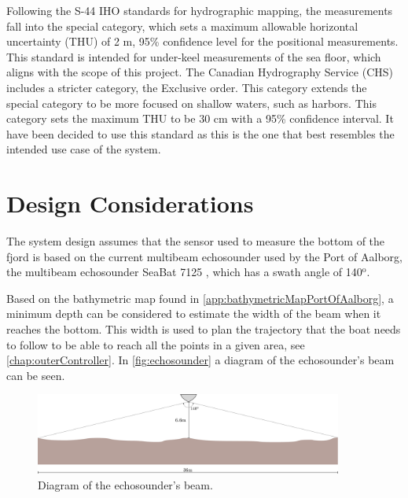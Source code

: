 Following the S-44 IHO standards for hydrographic mapping, the measurements fall into the special category, which sets a maximum allowable horizontal uncertainty (THU) of 2 m, 95\% confidence level for the positional measurements. 
This standard is intended for under-keel measurements of the sea floor, which aligns with the scope of this project.\cite{IHO-S-44} 
The Canadian Hydrography Service (CHS) includes a stricter category, the Exclusive order. 
This category extends the special category to be more focused on shallow waters, such as harbors. 
This category sets the maximum THU to be 30 cm with a 95\% confidence interval. 
It have been decided to use this standard as this is the one that best resembles the intended use case of the system. \cite{CHS} 

\section{Design Considerations}\label{sec:designconsiderations}
The system design assumes that the sensor used to measure the bottom of the fjord is based on the current multibeam echosounder used by the Port of Aalborg, the multibeam echosounder SeaBat 7125 \cite{echoSounder}, which has a swath angle of 140$^\mathrm{o}$.

Based on the bathymetric map found in \autoref{app:bathymetricMapPortOfAalborg}, a minimum depth can be considered to estimate the width of the beam when it reaches the bottom. This width is used to plan the trajectory that the boat needs to follow to be able to reach all the points in a given area, see \autoref{chap:outerController}. In \autoref{fig:echosounder} a diagram of the echosounder's beam can be seen.

\begin{figure}[H]
    \includegraphics[width=0.9\textwidth]{figures/echosounder}
    \caption{Diagram of the echosounder's beam.}
    \label{fig:echosounder}
\end{figure}

